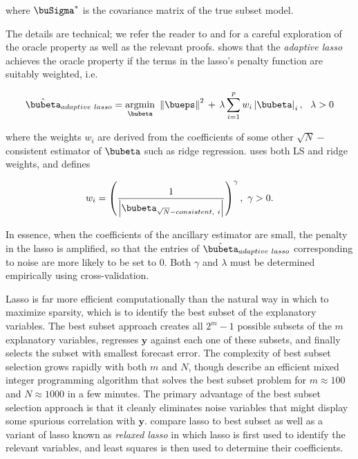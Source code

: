 \documentclass[graybox,envcountchap,sectrefs]{svmono}\usepackage[]{graphicx}\usepackage[]{xcolor}
\begin{document}
\begin{appendices}
where $\buSigma^{*}$ is the covariance matrix of the true subset
model. 

The details are technical; we refer the reader to \citet{FanLi2001}
and \citet{Zou2006} for a careful exploration of the oracle property
as well as the relevant proofs. \citet{Zou2006} shows that the \emph{adaptive
lasso} achieves the oracle property if the terms in the lasso's penalty
function are suitably weighted, i.e.

\begin{equation}
\hat{\bubeta}_{adaptive\ lasso}=\underset{\bubeta}{\mathrm{argmin}}\ \left\Vert \bueps\right\Vert ^{2}\,+\,\lambda\sum_{i=1}^{p}w_{i}\left|\bubeta\right|_{i},\ \ \lambda>0\label{eq:AdaptiveLasso}
\end{equation}

where the weights $w_{i}$ are derived from the coefficients of some
other $\sqrt{N}-$consistent estimator of $\bubeta$ such as ridge
regression. \citet{Zou2006} uses both LS and ridge weights, and defines

\begin{equation}
w_{i}=\left(\frac{1}{\left|\bubeta_{\sqrt{N}-consistent,\ i}\right|}\right)^{\gamma},\ \gamma>0.\label{eq:AdaptiveLassoWeights}
\end{equation}

In essence, when the coefficients of the ancillary estimator are small,
the penalty in the lasso is amplified, so that the entries of $\hat{\bubeta}_{adaptive\ lasso}$
corresponding to noise are more likely to be set to 0. Both $\gamma$
and $\lambda$ must be determined empirically using cross-validation. 

Lasso is far more efficient computationally than the natural way in
which to maximize sparsity, which is to identify the best subset of
the explanatory variables. The best subset approach creates all $2^{m}-1$
possible subsets of the $m$ explanatory variables, regresses $\mathbf{y}$
against each one of these subsets, and finally selects the subset
with smallest forecast error. The complexity of best subset selection
grows rapidly with both $m$ and $N$, though \citet{BertsimasKingMazumder2016}
describe an efficient mixed integer programming algorithm that solves
the best subset problem for $m\approx100$ and $N\approx1000$ in
a few minutes. The primary advantage of the best subset selection
approach is that it cleanly eliminates noise variables that might
display some spurious correlation with $\mathbf{y}$. \citet{HastieTibshiraniTibshirani2020}
compare lasso to best subset as well as a variant of lasso known as
\emph{relaxed lasso} in which lasso is first used to identify the
relevant variables, and least squares is then used to determine their
coefficients.


\end{appendices}
\end{document}
